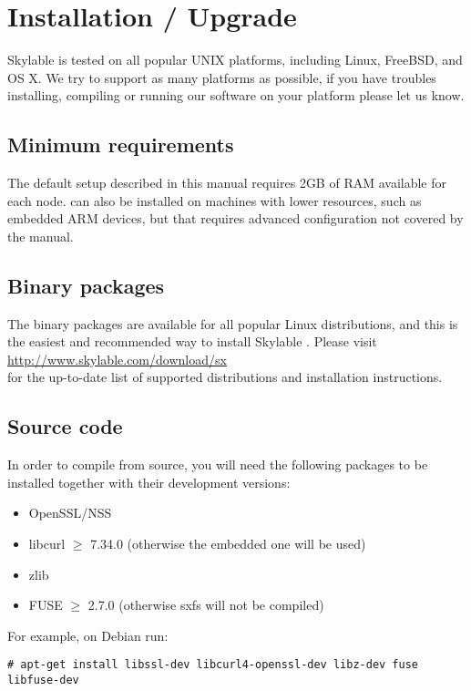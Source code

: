 \chapter{Installation / Upgrade}

Skylable \SX is tested on all popular UNIX platforms, including Linux,
FreeBSD, and OS X. We try to support as many platforms as possible,
if you have troubles installing, compiling or running our software on
your platform please let us know.

\section{Minimum requirements}
The default setup described in this manual requires 2GB of RAM available
for each node. \SX can also be installed on machines with lower resources,
such as embedded ARM devices, but that requires advanced configuration not
covered by the manual.

\section{Binary packages}
The binary packages are available for all popular Linux distributions,
and this is the easiest and recommended way to install Skylable \SX.
Please visit\\
\url{http://www.skylable.com/download/sx}\\
for the up-to-date list of supported distributions and installation instructions.

\section{Source code}
In order to compile \SX from source, you will need the following packages to
be installed together with their development versions:
\begin{itemize}
    \item OpenSSL/NSS
    \item libcurl $\ge$ 7.34.0 (otherwise the embedded one will be used)
    \item zlib
    \item FUSE $\ge$ 2.7.0 (otherwise sxfs will not be compiled)
\end{itemize}
For example, on Debian run:
\begin{lstlisting}
# apt-get install libssl-dev libcurl4-openssl-dev libz-dev fuse libfuse-dev
\end{lstlisting}

